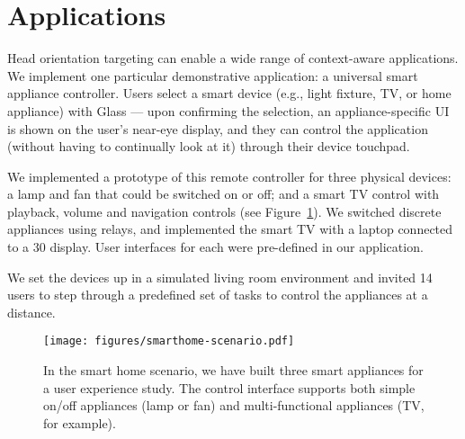 \section{Applications}
\label{sec:applications}

Head orientation targeting can enable a wide range of context-aware applications. We implement one particular demonstrative application: a universal smart appliance controller. Users select a smart device (e.g., light fixture, TV, or home appliance) with Glass --- upon confirming the selection, an appliance-specific UI is shown on the user's near-eye display, and they can control the application (without having to continually look at it) through their device touchpad.

We implemented a prototype of this remote controller for three physical devices: a lamp and fan that could be switched on or off; and a smart TV control with playback, volume and navigation controls (see Figure~\ref{fig:smart-home}). We switched discrete appliances using relays, and implemented the smart TV with a laptop connected to a 30\inch{} display. User interfaces for each were pre-defined in our application. 

We set the devices up in a simulated living room environment and invited 14 users to step through a predefined set of tasks to control the appliances at a distance. 



\begin{figure}[t]
\centering
\texttt{[image: figures/smarthome-scenario.pdf]}
\caption{In the smart home scenario, we have built three smart appliances for a user experience study. The control interface supports both simple on/off appliances (lamp or fan) and multi-functional appliances (TV, for example).}
\label{fig:smart-home}
\end{figure}

